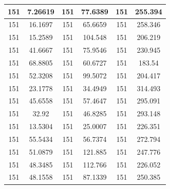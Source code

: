 \documentclass{article}
\begin{document}
\begin{tabular}{cccccc}
151&7.26619&151&77.6389&151&255.394 \\ \hline
151&16.1697&151&65.6659&151&258.346 \\ \hline
151&15.2589&151&104.548&151&206.219 \\ \hline
151&41.6667&151&75.9546&151&230.945 \\ \hline
151&68.8805&151&60.6727&151&183.54 \\ \hline
151&52.3208&151&99.5072&151&204.417 \\ \hline
151&23.1778&151&34.4949&151&314.493 \\ \hline
151&45.6558&151&57.4647&151&295.091 \\ \hline
151&32.92&151&46.8285&151&293.148 \\ \hline
151&13.5304&151&25.0007&151&226.351 \\ \hline
151&55.5434&151&56.7374&151&272.794 \\ \hline
151&51.0879&151&121.885&151&247.776 \\ \hline
151&48.3485&151&112.766&151&226.052 \\ \hline
151&48.1558&151&87.1339&151&250.385 \\ \hline
\end{tabular}
\end{document}

